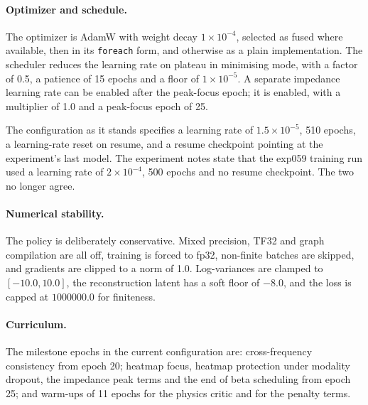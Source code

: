 \paragraph{Optimizer and schedule.} The optimizer is AdamW with weight decay $1 \times 10^{-4}$,
selected as fused where available, then in its \texttt{foreach} form, and otherwise as a plain
implementation. The scheduler reduces the learning rate on plateau in minimising mode, with a factor
of 0.5, a patience of 15 epochs and a floor of $1 \times 10^{-5}$. A separate impedance learning rate
can be enabled after the peak-focus epoch; it is enabled, with a multiplier of 1.0 and a peak-focus
epoch of 25.

The configuration as it stands specifies a learning rate of $1.5 \times 10^{-5}$, 510 epochs, a
learning-rate reset on resume, and a resume checkpoint pointing at the experiment's last model. The
experiment notes state that the exp059 training run used a learning rate of $2 \times 10^{-4}$, 500
epochs and no resume checkpoint. The two no longer agree.

\paragraph{Numerical stability.} The policy is deliberately conservative. Mixed precision, TF32 and
graph compilation are all off, training is forced to fp32, non-finite batches are skipped, and
gradients are clipped to a norm of 1.0. Log-variances are clamped to $[-10.0, 10.0]$, the
reconstruction latent has a soft floor of $-8.0$, and the loss is capped at $1000000.0$ for
finiteness.

\paragraph{Curriculum.} The milestone epochs in the current configuration are: cross-frequency
consistency from epoch 20; heatmap focus, heatmap protection under modality dropout, the impedance
peak terms and the end of beta scheduling from epoch 25; and warm-ups of 11 epochs for the physics
critic and for the penalty terms.


